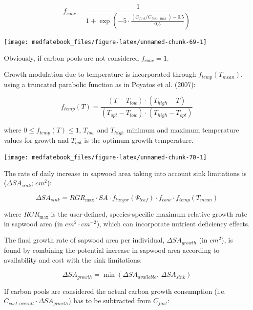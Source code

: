\documentclass[]{book}
\begin{document}
\begin{equation}
f_{conc} = \frac{1}{1+\exp \left(-5 \cdot \frac{(C_{fast}/C_{fast, \max})-0.5}{0.5}\right)}
\end{equation}

\begin{center}\texttt{[image: medfatebook\_files/figure-latex/unnamed-chunk-69-1]} \end{center}

Obviously, if carbon pools are not considered \(f_{conc} = 1\).

Growth modulation due to temperature is incorporated through
\(f_{temp}(T_{mean})\), using a truncated parabolic function as in
Poyatos et al. (2007):

\begin{equation}
f_{temp}(T) = \frac{(T-T_{low}) \cdot (T_{high}-T)}{(T_{opt}-T_{low}) \cdot (T_{high}-T_{opt})}
\end{equation}

where \(0 \leq f_{temp}(T) \leq 1\), \(T_{low}\) and \(T_{high}\)
minimum and maximum temperature values for growth and \(T_{opt}\) is the
optimum growth temperature.

\begin{center}\texttt{[image: medfatebook\_files/figure-latex/unnamed-chunk-70-1]} \end{center}

The rate of daily increase in sapwood area taking into account sink
limitations is (\(\Delta SA_{sink}\); \(cm^2\)):

\begin{equation}
\Delta SA_{sink} = RGR_{\max} \cdot SA \cdot f_{turgor}(\Psi_{leaf}) \cdot f_{conc} \cdot f_{temp}(T_{mean})
\end{equation}

where \(RGR_{\max}\) is the user-defined, species-specific maximum
relative growth rate in sapwood area (in \(cm^2·cm^{-2}\)), which can
incorporate nutrient deficiency effects.

The final growth rate of sapwood area per individual,
\(\Delta SA_{growth}\) (in \(cm^2\)), is found by combining the
potential increase in sapwood area according to availability and cost
with the sink limitations:

\begin{equation}
\Delta SA_{growth} = \min(\Delta SA_{available}, \, \Delta SA_{sink})
\end{equation}

If carbon pools are considered the actual carbon growth consumption
(i.e. \(C_{cost,overall} \cdot \Delta SA_{growth}\)) has to be
subtracted from \(C_{fast}\):
\end{document}
